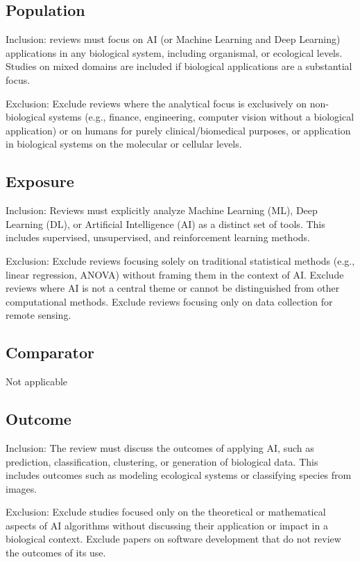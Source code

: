 \documentclass{article}
\begin{document}
\subsection{Population}
Inclusion: reviews must focus on AI (or Machine Learning and Deep Learning) applications in any biological system, including organismal, or ecological levels. Studies on mixed domains are included if biological applications are a substantial focus.

Exclusion: Exclude reviews where the analytical focus is exclusively on non-biological systems (e.g., finance, engineering, computer vision without a biological application) or on humans for purely clinical/biomedical purposes, or application in biological systems on the molecular or cellular levels.

\subsection{Exposure}
Inclusion: Reviews must explicitly analyze Machine Learning (ML), Deep Learning (DL), or Artificial Intelligence (AI) as a distinct set of tools. This includes supervised, unsupervised, and reinforcement learning methods.

Exclusion: Exclude reviews focusing solely on traditional statistical methods (e.g., linear regression, ANOVA) without framing them in the context of AI. Exclude reviews where AI is not a central theme or cannot be distinguished from other computational methods. Exclude reviews focusing only on data collection for remote sensing.

\subsection{Comparator}
Not applicable

\subsection{Outcome}
Inclusion: The review must discuss the outcomes of applying AI, such as prediction, classification, clustering, or generation of biological data. This includes outcomes such as modeling ecological systems or classifying species from images.

Exclusion: Exclude studies focused only on the theoretical or mathematical aspects of AI algorithms without discussing their application or impact in a biological context. Exclude papers on software development that do not review the outcomes of its use.
\end{document}
